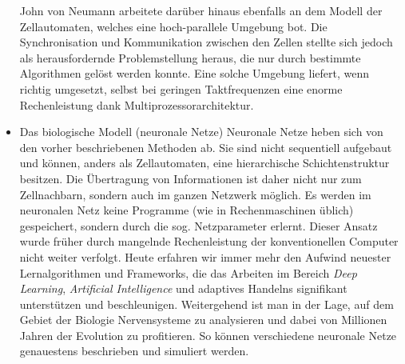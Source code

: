 \begin{itemize}
			\subitem John von Neumann arbeitete darüber hinaus ebenfalls an dem Modell der Zellautomaten, welches eine hoch-parallele Umgebung bot. Die Synchronisation und Kommunikation zwischen den Zellen stellte sich jedoch als herausfordernde Problemstellung heraus, die nur durch bestimmte Algorithmen gelöst werden konnte. Eine solche Umgebung liefert, wenn richtig umgesetzt, selbst bei geringen Taktfrequenzen eine enorme Rechenleistung dank Multiprozessorarchitektur.
		\item Das biologische Modell (neuronale Netze)
			\subitem Neuronale Netze heben sich von den vorher beschriebenen Methoden ab. Sie sind nicht sequentiell aufgebaut und können, anders als Zellautomaten, eine hierarchische Schichtenstruktur besitzen. Die Übertragung von Informationen ist daher nicht nur zum Zellnachbarn, sondern auch im ganzen Netzwerk möglich. Es werden im neuronalen Netz keine Programme (wie in Rechenmaschinen üblich) gespeichert, sondern durch die sog. Netzparameter erlernt. Dieser Ansatz wurde früher durch mangelnde Rechenleistung der konventionellen Computer nicht weiter verfolgt. Heute erfahren wir immer mehr den Aufwind neuester Lernalgorithmen und Frameworks, die das Arbeiten im Bereich \textit{Deep Learning}, \textit{Artificial Intelligence} und adaptives Handelns signifikant unterstützen und beschleunigen. Weitergehend ist man in der Lage, auf dem Gebiet der Biologie Nervensysteme zu analysieren und dabei von Millionen Jahren der Evolution zu profitieren. So können verschiedene neuronale Netze genauestens beschrieben und simuliert werden.
	\end{itemize}
